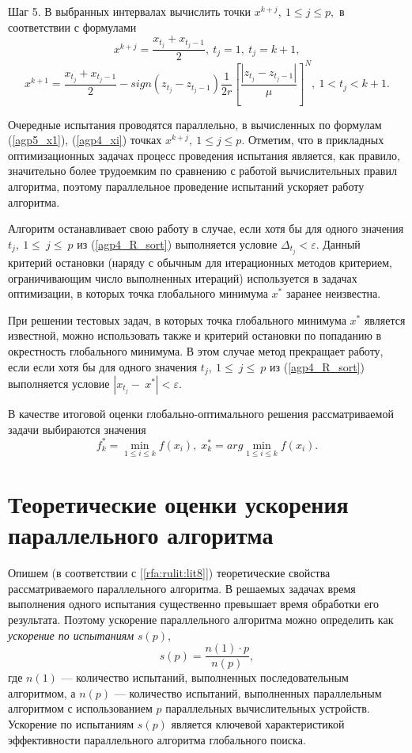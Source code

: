 \documentclass[10pt,a4paper]{book}
\begin{document}
Шаг 5. В выбранных интервалах вычислить точки $x^{k+j},\ 1\leq j\leq p,$ в соответствии с формулами
\begin{equation}
\label{agp5_x1}
	x^{k+j}=\frac{x_{t_j}+x_{t_j-1}}{2},\ t_j=1,\ t_j=k+1,
\end{equation}	
	\begin{equation}
\label{agp4_xi}	
	x^{k+1}=\frac{x_{t_j}+x_{t_j-1}}{2}-sign\left(z_{t_j}-z_{t_j-1}\right)\frac{1}{2r}\left[\frac{\left|z_{t_j}-z_{t_j-1}\right|}{\mu}\right]^N,\ 1<t_j<k+1.
\end{equation}	

Очередные испытания проводятся параллельно, в вычисленных по формулам (\ref{agp5_x1}), (\ref{agp4_xi}) точках $x^{k+j},\ 1\leq j\leq p$.
Отметим, что в прикладных оптимизационных задачах процесс проведения испытания является, как правило, значительно более трудоемким по сравнению с работой вычислительных правил алгоритма, поэтому параллельное проведение испытаний ускоряет работу алгоритма.

Алгоритм останавливает свою работу в случае, если хотя бы для одного значения $t_j,\ 1\le\ j\le\ p$ из (\ref{agp4_R_sort}) выполняется условие \(\Delta_{t_j} < \varepsilon\). Данный критерий остановки (наряду с обычным для итерационных методов критерием, ограничивающим число выполненных итераций) используется в задачах оптимизации, в которых точка глобального минимума $x^*$ заранее неизвестна. 
	 
При решении тестовых задач, в которых точка глобального минимума $x^*$ является  известной, можно использовать также и критерий остановки по попаданию в окрестность глобального минимума. В этом случае метод прекращает работу, если если хотя бы для одного значения $t_j,\ 1\le\ j\le\ p$ из (\ref{agp4_R_sort}) выполняется условие $\left|x_{t_j}-\ x^\ast\right| < \varepsilon.$
	
В качестве итоговой оценки глобально-оптимального решения рассматриваемой задачи выбираются значения 
\begin{equation}
f_k^*=\min_{1\leqslant i \leqslant k}f(x_i), \; x_k^*=arg \min_{1\leqslant i \leqslant k}f(x_i).
\end{equation}


\section{Теоретические оценки ускорения параллельного алгоритма}

Опишем (в соответствии с [\ref{rfa:rulit:lit8}]) теоретические свойства рассматриваемого параллельного алгоритма. В решаемых задачах время выполнения одного испытания существенно превышает время обработки его результата. Поэтому ускорение параллельного алгоритма можно определить как \textit{ускорение по испытаниям} $s(p)$,
\begin{equation} \label{par_trl_ref}
s(p) = \frac{n(1) \cdot p}{n(p)},
\end{equation}
где $n(1)$ --- количество испытаний, выполненных последовательным алгоритмом, а $n(p)$ --- количество испытаний, выполненных параллельным алгоритмом с использованием $p$ параллельных вычислительных устройств. Ускорение по испытаниям $s(p)$ является ключевой характеристикой эффективности параллельного алгоритма глобального поиска.
\end{document}
